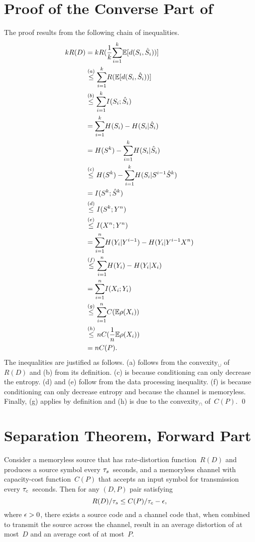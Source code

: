 \begin{subappendices}

\section{Proof of the Converse Part of }
\label{app:separationproof}

The proof results from the following chain of inequalities.
{\allowdisplaybreaks
\begin{align*}
  kR(D) &= k R(\frac1k {\sum_{i=1}^k} \mathbb{E}[d(S_i, {\hat{S}}_i))] \\
  &\stackrel{(a)}{\le} {\sum_{i=1}^k} R(\mathbb{E}[d(S_i, {\hat{S}}_i))] \\
  &\stackrel{(b)}{\le} {\sum_{i=1}^k} I(S_i; {\hat{S}}_i) \\
  &= {\sum_{i=1}^k} H(S_i) - H(S_i|{\hat{S}}_i) \\
  &= H(S^k) - {\sum_{i=1}^k} H(S_i|{\hat{S}}_i) \\
  &\stackrel{(c)}{\le} H(S^k) - {\sum_{i=1}^k} H(S_i|S^{i-1} {\hat{S}}^k) \\
  &=I(S^k;{\hat{S}}^k) \\
  &\stackrel{(d)}{\le} I(S^k; Y^n) \\
  &\stackrel{(e)}{\le} I(X^n; Y^n) \\
  &= {\sum_{i=1}^n} H(Y_i|Y^{i-1}) - H(Y_i|Y^{i-1} X^n)  \\
  &\stackrel{(f)}{\le} {\sum_{i=1}^n} H(Y_i) - H(Y_i|X_i) \\
  &= {\sum_{i=1}^n} I(X_i; Y_i) \\
  &\stackrel{(g)}{\le} {\sum_{i=1}^n} C(\mathbb{E} \rho(X_i)) \\
  &\stackrel{(h)}{\le} n C(\frac1n \mathbb{E} \rho(X_i)) \\
  &= n C(P).
\end{align*}}%
The inequalities are justified as follows. (a) follows from the convexity$_\cup$
of~$R(D)$ and (b) from its definition. (c) is because
conditioning can only decrease the entropy. (d) and (e) follow from the data
processing inequality. (f) is because conditioning can only decrease entropy and
because the channel is memoryless. Finally, (g) applies by definition and (h) is
due to the convexity$_\cap$ of~$C(P)$.  \hfil\qed


\section{Separation Theorem, Forward Part}\label{app:separationforward}

\begin{theorem}
  \label{thm:separationforward}
  Consider a memoryless source that has rate-distortion function~$R(D)$ and 
  produces a source symbol every ${\tau_s}$~seconds, and a memoryless channel with
  capacity-cost function~$C(P)$ that accepts an input symbol for transmission
  every ${\tau_c}$~seconds. Then for any $(D,P)$ pair satisfying
  \begin{equation}
    \label{eq:separationforward}
    R(D)/{\tau_s} \le C(P)/{\tau_c} - \epsilon,
  \end{equation}
  where $\epsilon > 0$, there exists a source code and a channel code that, when
  combined to transmit the source across the channel, result in an average
  distortion of at most~$D$ and an average cost of at most~$P$.
\end{theorem}


\end{subappendices}
